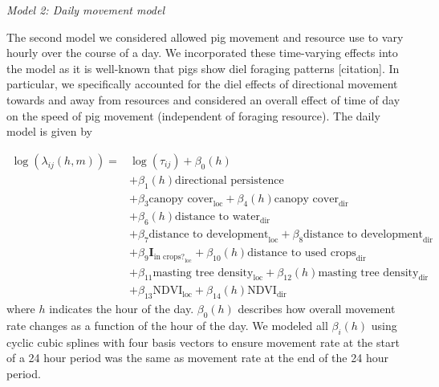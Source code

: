 \documentclass[a4paper]{article}
\begin{document}

\bigskip
\noindent
\emph{Model 2: Daily movement model}

The second model we considered allowed pig movement and resource use to vary hourly over the course of a day. We incorporated these time-varying effects into the model as it is well-known that pigs show diel foraging patterns [citation].  In particular, we specifically accounted for the diel effects of directional movement towards and away from resources and considered an overall effect of time of day on the speed of pig movement (independent of foraging resource). The daily model is given by

\begin{align}
  \log(\lambda_{ij}(h, m)) = & \log(\tau_{ij}) + \beta_0(h) \\
  & + \beta_1(h) \text{directional persistence} \\
  & + \beta_{3} \text{canopy cover}_{\text{loc}} + \beta_{4}(h) \text{canopy cover}_{\text{dir}} \\
  & + \beta_6(h) \text{distance to water}_{\text{dir}} \\
  & + \beta_7 \text{distance to development}_{\text{loc}} + \beta_8 \text{distance to development}_{\text{dir}} \\
  & + \beta_9\mathbf{I}_{\text{in crops?}_{\text{loc}}} + \beta_{10}(h) \text{distance to used crops}_{\text{dir}} \\
  & + \beta_{11} \text{masting tree density}_{\text{loc}} + \beta_{12}(h) \text{masting tree density}_{\text{dir}} \\
  & + \beta_{13} \text{NDVI}_{\text{loc}} + \beta_{14}(h) \text{NDVI}_{\text{dir}}
\end{align}
where $h$ indicates the hour of the day.  $\beta_0(h)$ describes how overall movement rate changes as a function of the hour of the day. We modeled all $\beta_i(h)$ using cyclic cubic splines with four basis vectors \citep{Wood2006} to ensure movement rate at the start of a 24 hour period was the same as movement rate at the end of the 24 hour period.
\end{document}
